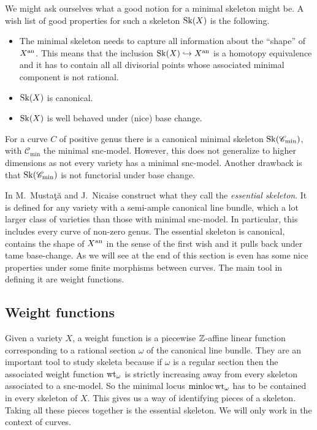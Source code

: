 We might ask ourselves what a good notion for a minimal skeleton might be. 
A wish list of good properties for such a skeleton $\operatorname{Sk}(X)$ is the following. 
\begin{itemize}
	\item The minimal skeleton needs to capture all information about the ``shape'' of $X{}^{\text{an}}$. 
		This means that the inclusion $\operatorname{Sk}(X) \hookrightarrow X{}^{\text{an}}$ is a homotopy equivalence and it has to contain all all divisorial points whose associated minimal component is not rational.
	\item $\operatorname{Sk}(X)$ is canonical. 
	\item $\operatorname{Sk}(X)$ is well behaved under (nice) base change. 
\end{itemize}
For a curve $C$ of positive genus there is a canonical minimal skeleton $\operatorname{Sk}(\mathscr C_\text{min} )$, with $\mathscr C_\text{min} $ the minimal snc-model.
However, this does not generalize to higher dimensions as not every variety has a minimal snc-model. 
Another drawback is that $\operatorname{Sk}(\mathscr C_\text{min})$ is not functorial under base change. 

In \cite{mustataWeightFunctionsNonArchimedean2015} M.\ Mustaţă and J.\ Nicaise construct what they call the \emph{essential skeleton}.
It is defined for any variety with a semi-ample canonical line bundle, which a lot larger class of varieties than those with minimal snc-model. 
In particular, this includes every curve of non-zero genus. 
The essential skeleton is canonical, contains the shape of $X{}^{\text{an}}$ in the sense of the first wish and it pulls back under tame base-change. 
As we will see at the end of this section is even has some nice properties under some finite morphisms between curves. 
The main tool in defining it are weight functions. 

\subsection{Weight functions} \label{sec:weight_functions}
Given a variety $X$, a weight function is a piecewise $\mathbb{Z}$-affine linear function corresponding to a rational section $\omega$ of the canonical line bundle. 
They are an important tool to study skeleta because if $\omega$ is a regular section then the associated weight function $\operatorname{wt}_\omega$ is strictly increasing away from every skeleton associated to a snc-model. 
So the minimal locus $\operatorname{minloc} \operatorname{wt}_\omega$ has to be contained in every skeleton of $X$. 
This gives us a way of identifying pieces of a skeleton. 
Taking all these pieces together is the essential skeleton. 
We will only work in the context of curves. 

